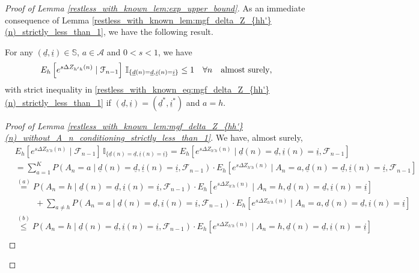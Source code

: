 \begin{proof}[Proof of Lemma \ref{restless_with_known_lem:exp_upper_bound}]
As an immediate consequence of Lemma \ref{restless_with_known_lem:mgf_delta_Z_{hh'}(n)_strictly_less_than_1}, we have the following result.
\begin{lemma}\label{restless_with_known_lem:mgf_delta_Z_{hh'}(n)_without_A_n_conditioning_strictly_less_than_1}
For any $(\underline{d},\underline{i})\in \mathbb{S}$, $a\in\mathcal{A}$ and $0<s<1$, we have
 	\begin{equation}
 		E_h\left[e^{s\Delta Z_{h'h}(n)}\mid \mathcal{F}_{n-1}\right]\,\mathbb{I}_{\{\underline{d}(n)=\underline{d},\underline{i}(n)=\underline{i}\}}\leq 1\quad \forall n\quad \text{almost surely},\label{restless_with_known_eq:mgf_delta_Z_{hh'}(n)_without_A_n_conditioning_strictly_less_than_1} 
  	\end{equation}
 	with strict inequality in \eqref{restless_with_known_eq:mgf_delta_Z_{hh'}(n)_strictly_less_than_1} if $(\underline{d},\underline{i})=(\underline{d}^*,\underline{i}^*)$ and $a=h$.
\end{lemma}
\begin{proof}[Proof of Lemma \ref{restless_with_known_lem:mgf_delta_Z_{hh'}(n)_without_A_n_conditioning_strictly_less_than_1}]
We have, almost surely,
\begin{align}
	&E_h\left[e^{s\Delta Z_{h'h}(n)}\mid \mathcal{F}_{n-1}\right]\,\mathbb{I}_{\{\underline{d}(n)=\underline{d},\underline{i}(n)=\underline{i}\}}=E_h\left[e^{s\Delta Z_{h'h}(n)}\mid\underline{d}(n)=\underline{d},\underline{i}(n)=\underline{i},\mathcal{F}_{n-1}\right]\nonumber\\
	&=\sum\limits_{a=1}^{K} P(A_n=a\mid\underline{d}(n)=\underline{d},\underline{i}(n)=\underline{i},\mathcal{F}_{n-1})\cdot E_h\left[e^{s\Delta Z_{h'h}(n)}\mid A_n=a,\underline{d}(n)=\underline{d},\underline{i}(n)=\underline{i},\mathcal{F}_{n-1}\right]\nonumber\\
	&\stackrel{(a)}=P(A_n=h\mid\underline{d}(n)=\underline{d},\underline{i}(n)=\underline{i},\mathcal{F}_{n-1})\cdot E_h\left[e^{s\Delta Z_{h'h}(n)}\mid A_n=h,\underline{d}(n)=\underline{d},\underline{i}(n)=\underline{i}\right]\nonumber\\
	&\hspace{1cm}+\sum\limits_{a\neq h}P(A_n=a\mid \underline{d}(n)=\underline{d},\underline{i}(n)=\underline{i},\mathcal{F}_{n-1})\cdot E_h\left[e^{s\Delta Z_{h'h}(n)}\mid A_n=a,\underline{d}(n)=\underline{d},\underline{i}(n)=\underline{i}\right]\nonumber\\
	&\stackrel{(b)}{\leq}P(A_n=h\mid \underline{d}(n)=\underline{d},\underline{i}(n)=\underline{i},\mathcal{F}_{n-1})\cdot E_h\left[e^{s\Delta Z_{h'h}(n)}\mid A_n=h,\underline{d}(n)=\underline{d},\underline{i}(n)=\underline{i}\right]\nonumber\\

\end{align}
\end{proof}
\end{proof}
